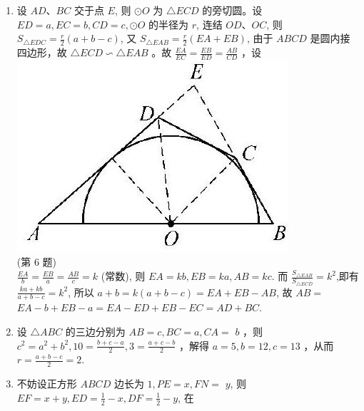 \documentclass[10pt]{article}
\begin{document}
\begin{enumerate}
(第 5 题)
  \item 设 $A D 、 B C$ 交于点 $E$, 则 $\odot O$ 为 $\triangle E C D$ 的旁切圆。设 $E D=a, E C=b, C D=c, \odot O$ 的半径为 $r$, 连结 $O D 、 O C$, 则 $S_{\triangle E D C}=\frac{r}{2}(a+b-c)$, 又 $S_{\triangle E A B}=\frac{r}{2}(E A+E B)$, 由于 $A B C D$ 是圆内接四边形，故 $\triangle E C D \backsim \triangle E A B$ 。故 $\frac{E A}{E C}=\frac{E B}{E D}=\frac{A B}{C D}$ ，设\\
\includegraphics[max width=\textwidth, center]{2024_10_30_66b8e5e701da2093c133g-094(1)}\\
(第 6 题)\\
$\frac{E A}{b}=\frac{E B}{a}=\frac{A B}{c}=k$ (常数), 则 $E A=k b, E B=k a, A B=k c$. 而 $\frac{S_{\triangle E A B}}{S_{\triangle E C D}}=k^{2}$,即有 $\frac{k a+k b}{a+b-c}=k^{2}$, 所以 $a+b=k(a+b-c)=E A+E B-A B$, 故 $A B=$ $E A-b+E B-a=E A-E D+E B-E C=A D+B C$.
  \item 设 $\triangle A B C$ 的三边分别为 $A B=c, B C=a, C A=$ $b$ ，则 $c^{2}=a^{2}+b^{2}, 10=\frac{b+c-a}{2}, 3=\frac{a+c-b}{2}$ ，解得 $a=5, b=12, c=13$ ，从而 $r=\frac{a+b-c}{2}=2$.
  \item 不妨设正方形 $A B C D$ 边长为 $1, P E=x, F N=$ $y$, 则 $E F=x+y, E D=\frac{1}{2}-x, D F=\frac{1}{2}-y$, 在\\

\end{enumerate}
\end{document}
